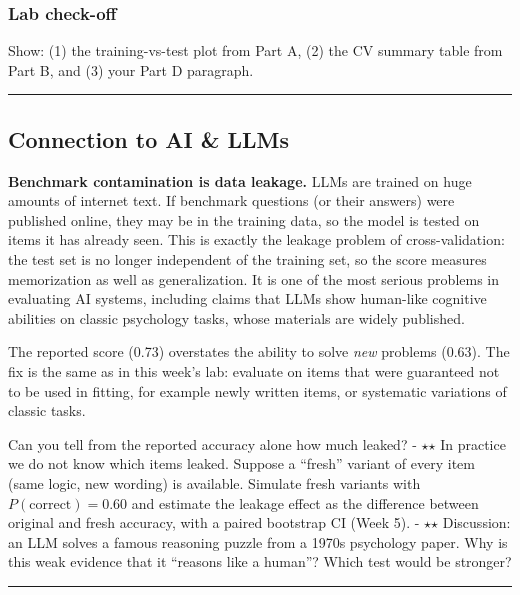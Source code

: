 \subsubsection{Lab check-off}

Show: (1) the training-vs-test plot from Part A, (2) the CV summary
table from Part B, and (3) your Part D paragraph.

\begin{center}\rule{0.5\linewidth}{0.5pt}\end{center}

\subsection{Connection to AI \& LLMs}

\textbf{Benchmark contamination is data leakage.} LLMs are trained on
huge amounts of internet text. If benchmark questions (or their answers)
were published online, they may be in the training data, so the model is
tested on items it has already seen. This is exactly the leakage problem
of cross-validation: the test set is no longer independent of the
training set, so the score measures memorization as well as
generalization. It is one of the most serious problems in evaluating AI
systems, including claims that LLMs show human-like cognitive abilities
on classic psychology tasks, whose materials are widely published.

The reported score (0.73) overstates the ability to solve \emph{new}
problems (0.63). The fix is the same as in this week's lab: evaluate on
items that were guaranteed not to be used in fitting, for example newly
written items, or systematic variations of classic tasks.

Can you tell from the reported accuracy alone how much leaked? - \ensuremath{\star}\ensuremath{\star} In
practice we do not know which items leaked. Suppose a ``fresh'' variant
of every item (same logic, new wording) is available. Simulate fresh
variants with \(P(\text{correct}) = 0.60\) and estimate the leakage
effect as the difference between original and fresh accuracy, with a
paired bootstrap CI (Week 5). - \ensuremath{\star}\ensuremath{\star} Discussion: an LLM solves a famous
reasoning puzzle from a 1970s psychology paper. Why is this weak
evidence that it ``reasons like a human''? Which test would be stronger?

\begin{center}\rule{0.5\linewidth}{0.5pt}\end{center}

